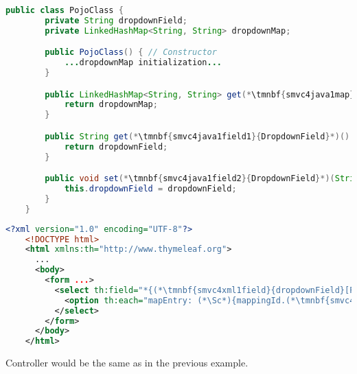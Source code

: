 \newpage

\begin{lstlisting}[language=Java, title={POJO class with one String field}]
    public class PojoClass {
        private String dropdownField;
        private LinkedHashMap<String, String> dropdownMap;

        public PojoClass() { // Constructor
            ...dropdownMap initialization...
        }

        public LinkedHashMap<String, String> get(*\tmnbf{smvc4java1map}{DropdownMap}*)() {
            return dropdownMap;
        }

        public String get(*\tmnbf{smvc4java1field1}{DropdownField}*)() {
            return dropdownField;
        }

        public void set(*\tmnbf{smvc4java1field2}{DropdownField}*)(String dropdownField) {
            this.dropdownField = dropdownField;
        }
    }
\end{lstlisting}
\begin{lstlisting}[language=XML, title={HTML form setting the field}]
    <?xml version="1.0" encoding="UTF-8"?>
    <!DOCTYPE html>
    <html xmlns:th="http://www.thymeleaf.org">
      ...
      <body>
        <form ...>
          <select th:field="*{(*\tmnbf{smvc4xml1field}{dropdownField}[ForestGreen]*)}">
            <option th:each="mapEntry: (*\Sc*){mappingId.(*\tmnbf{smvc4xml1map}{dropdownMap}[ForestGreen]*).entrySet()}" th:value="${mapEntry.key}" th:text="${mapEntry.value}"/>
          </select>
        </form>
      </body>
    </html>
\end{lstlisting}
\notenonlnosp Controller would be the same as in the previous example.
\newpage

